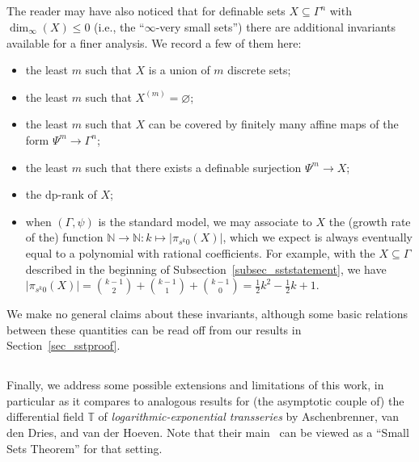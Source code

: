 \documentclass[11pt]{amsart}
\theoremstyle{plain}
\theoremstyle{definition}
\numberwithin{equation}{section}
\newcommand\N{\mathbb{N}}
\newcommand\0{\varnothing}
\begin{document}
\subsection{} The reader may have also noticed that for definable sets $X\subseteq\Gamma^n$ with $\dim_{\infty}(X)\leq 0$ (i.e., the ``$\infty$-very small sets'') there are additional invariants available for a finer analysis. We record a few of them here:
\begin{itemize}
\item the least $m$ such that $X$ is a union of $m$ discrete sets;
\item the least $m$ such that $X^{(m)}=\varnothing$;
\item the least $m$ such that $X$ can be covered by finitely many affine maps of the form $\Psi^m\to\Gamma^n$;
\item the least $m$ such that there exists a definable surjection $\Psi^m\to X$;
\item the dp-rank of $X$;
\item when $(\Gamma,\psi)$ is the standard model, we may associate to $X$ the (growth rate of the) function $\N\to\N:k\mapsto |\pi_{s^k0}(X)|$, which we expect is always eventually equal to a polynomial with rational coefficients. For example, with the $X\subseteq\Gamma$ described in the beginning of Subsection~\ref{subsec_sststatement}, we have $|\pi_{s^k0}(X)|={k-1\choose 2}+{k-1\choose 1}+{k-1\choose 0}=\frac{1}{2}k^2-\frac{1}{2}k+1$.
\end{itemize}
We make no general claims about these invariants, although some basic relations between these quantities can be read off from our results in Section~\ref{sec_sstproof}.
\subsection{} Finally, we address some possible extensions and limitations of this work, in particular as it compares to analogous results for (the asymptotic couple of) the differential field $\mathbb{T}$ of \emph{logarithmic-exponential transseries} by Aschenbrenner, van den Dries, and van der Hoeven.
Note that their main~\cite[Theorem 0.1]{adh-revisitingclosedac} can be viewed as a ``Small Sets Theorem'' for that setting.
\end{document}
